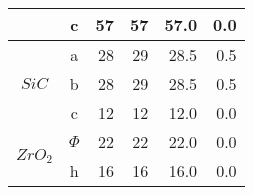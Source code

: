 \begin{table}[H]
{\begin{tabular}{|c|c|r|r|r|r|}
                                                                                                     & c        & 57                                                                              & 57                                                                              & 57.0                                                                               & 0.0                                                                                   \\ \hline
    \multirow{3}{*}{$SiC$}                                                                           & a        & 28                                                                              & 29                                                                              & 28.5                                                                               & 0.5                                                                                   \\ \cline{2-6} 
                                                                                                     & b        & 28                                                                              & 29                                                                              & 28.5                                                                               & 0.5                                                                                   \\ \cline{2-6} 
                                                                                                     & c        & 12                                                                              & 12                                                                              & 12.0                                                                               & 0.0                                                                                   \\ \hline
    \multirow{2}{*}{$ZrO_2$}                                                                         & $\Phi$   & 22                                                                              & 22                                                                              & 22.0                                                                               & 0.0                                                                                   \\ \cline{2-6} 
                                                                                                     & h        & 16                                                                              & 16                                                                              & 16.0                                                                               & 0.0                                                                                   \\ \hline

\end{tabular}}
\end{table}
